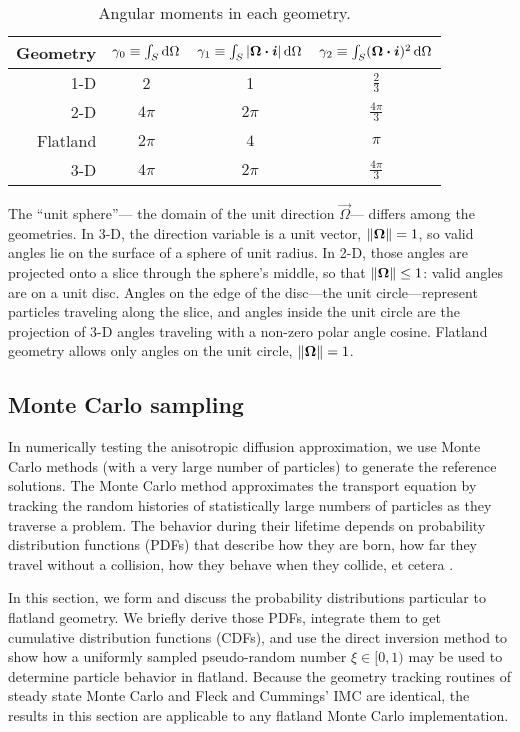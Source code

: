\begin{table}[htb]
  \centering
  \begin{tabular}{rccc}
\toprule
   Geometry
   & $\gamma_0 \equiv \int_S \mathop{}\!\mathrm{d}\Omega$
   & $\gamma_1 \equiv \int_S \left| \bm{\Omega}\bm{\cdot}\bm{i} \right| \mathop{}\!\mathrm{d}\Omega$
   & $\gamma_2 \equiv \int_S (\bm{\Omega}\bm{\cdot}\bm{i})^2 \mathop{}\!\mathrm{d}\Omega$
\\ \midrule
   1-D & 2 & 1 & $\frac{2}{3}$
   \\
   2-D & $4\pi$ & $2\pi$ & $\frac{4\pi}{3}$
   \\
   Flatland & $2\pi$ & $4$ & $\pi$
   \\
   3-D & $4\pi$ & $2\pi$ & $\frac{4\pi}{3}$
\\ \bottomrule
  \end{tabular}
  \caption{Angular moments in each geometry.}
  \label{tab:angularMoments}
\end{table}

The ``unit sphere''---%
the domain of the unit direction $\vec{\Omega}$---%
differs among the geometries. In 3-D, the direction variable is a unit vector,
$\left\| \bm{\Omega} \right\|=1$, so valid angles
lie on the surface of a sphere of unit radius. In 2-D, those angles are
projected onto a slice through the sphere's middle, so that
$\left\| \bm{\Omega} \right\| \le 1$: valid angles are on a unit disc. Angles on the edge
of the disc---the unit circle---represent particles traveling along the slice,
and angles inside the unit circle are the projection of 3-D angles traveling with a
non-zero polar angle cosine. Flatland geometry allows only angles on the unit
circle, $\left\| \bm{\Omega} \right\|=1$.

\subsection{Monte Carlo sampling}

In numerically testing the anisotropic diffusion approximation, we use Monte
Carlo methods (with a very large number of particles) to generate the reference
solutions.
The Monte Carlo method approximates the transport equation by tracking the
random histories of statistically large numbers of particles as they traverse a
problem. The behavior during their lifetime depends on probability distribution
functions (PDFs) that describe how they are born, how far they travel without a
collision, how they behave when they collide, et cetera \cite{Lew1984,Bro2004a}.

In this section, we form and discuss the probability distributions particular to
flatland geometry. We briefly derive those PDFs,
integrate them to get cumulative distribution functions
(CDFs), and use the direct inversion method to show how a uniformly sampled
pseudo-random number $\xi \in [0,1)$ may be used to determine particle behavior
in flatland. Because the geometry tracking routines of steady state Monte Carlo
and Fleck and Cummings' IMC are identical, the results in this section are
applicable to any flatland Monte Carlo implementation.

